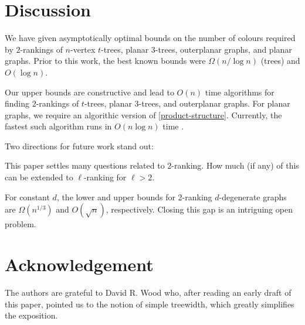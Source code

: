 \documentclass[kpfonts]{patmorin}
\theoremstyle{named}
\begin{document}
\section{Discussion}
\label{conclusion}

We have given asymptotically optimal bounds on the number of colours required by $2$-rankings of $n$-vertex $t$-trees, planar 3-trees, outerplanar graphs, and planar graphs.  Prior to this work, the best known bounds were $\Omega(n/\log n)$ (trees) and $O(\log n)$.

Our upper bounds are constructive and lead to $O(n)$ time algorithms for finding $2$-rankings of $t$-trees, planar 3-trees, and outerplanar graphs.  For planar graphs, we require an algorithic version of \cref{product-structure}. Currently, the fastest such algorithm runs in $O(n\log n)$ time \cite{morin:fast}.

Two directions for future work stand out:
\begin{inparaenum}[(i)]
    \item This paper settles many questions related to $2$-ranking.  How much (if any) of this can be extended to $\ell$-ranking for $\ell>2$.
    \item For constant $d$, the lower and upper bounds for 2-ranking $d$-degenerate graphs are $\Omega(n^{1/3})$ and $O(\sqrt{n})$, respectively.  Closing this gap is an intriguing open problem.
\end{inparaenum}

%
%

\section*{Acknowledgement}

The authors are grateful to David R. Wood who, after reading an early draft of this paper, pointed us to the notion of simple treewidth, which greatly simplifies the exposition.




\end{document}
